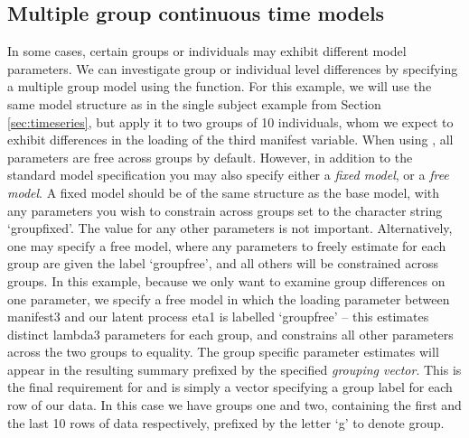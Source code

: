 \documentclass[nojss]{jss}\usepackage[]{graphicx}\usepackage[]{color}
\begin{document}
\subsection{Multiple group continuous time models}\nopagebreak
In some cases, certain groups or individuals may exhibit different model parameters. We can investigate group or individual level differences by specifying a multiple group model using the  function. For this example, we will use the same model structure as in the single subject example from Section \ref{sec:timeseries}, but apply it to two groups of 10 individuals, whom we expect to exhibit differences in the loading of the third manifest variable. When using , all parameters are free across groups by default. However, in addition to the standard model specification you may also specify either a \textit{fixed model}, or a \textit{free model}. A fixed model should be of the same structure as the base model, with any parameters you wish to constrain across groups set to the character string `groupfixed'.  The value for any other parameters is not important. Alternatively, one may specify a free model, where any parameters to freely estimate for each group are given the label `groupfree', and all others will be constrained across groups. In this example, because we only want to examine group differences on one parameter, we specify a free model in which the loading parameter between manifest3 and our latent process eta1 is labelled `groupfree' -- this estimates distinct lambda3 parameters for each group, and constrains all other parameters across the two groups to equality. The group specific parameter estimates will appear in the resulting summary prefixed by the specified \textit{grouping vector}. This is the final requirement for  and is simply a vector specifying a group label for each row of our data. In this case we have groups one and two, containing the first and the last 10 rows of data respectively, prefixed by the letter `g' to denote group.

\begin{Schunk}
\end{Schunk}
\end{document}

